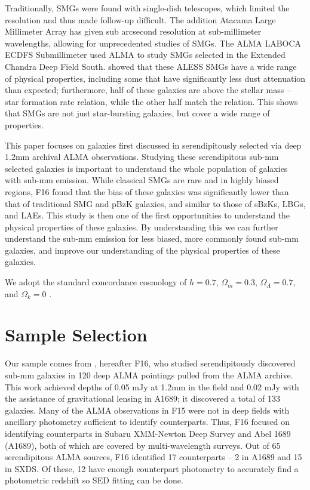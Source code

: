 \documentclass[preprint,natbib209]{aastex}
\begin{document}
Traditionally, SMGs were found with single-dish telescopes, which limited the resolution and thus made follow-up difficult. The addition Atacama Large Millimeter Array has given sub arcsecond resolution at sub-millimeter wavelengths, allowing for unprecedented studies of SMGs. The ALMA LABOCA ECDFS Submillimeter \citep[ALESS;][]{hodge13} used ALMA to study SMGs selected in the Extended Chandra Deep Field South. \cite{dacunha15} showed that these ALESS SMGs have a wide range of physical properties, including some that have significantly less dust attenuation than expected; furthermore, half of these galaxies are above the stellar mass -- star formation rate relation, while the other half match the relation. This shows that SMGs are not just star-bursting galaxies, but cover a wide range of properties.

This paper focuses on galaxies first discussed in \cite{fujimoto16} serendipitously selected via deep 1.2mm archival ALMA observations. 
Studying these serendipitous sub-mm selected galaxies is important to understand the whole population of galaxies with sub-mm emission.
While classical SMGs are rare and in highly biased regions, F16 found that the bias of these galaxies was significantly lower than that of traditional SMG and pBzK galaxies, and similar to those of sBzKs, LBGs, and LAEs. This study is then one of the first opportunities to understand the physical properties of these galaxies. By understanding this we can further understand the sub-mm emission for less biased, more commonly found sub-mm galaxies, and improve our understanding of the physical properties of these galaxies.

We adopt the standard concordance cosmology of $h = 0.7$, $\Omega_m = 0.3$, $\Omega_\Lambda = 0.7$, 
and $\Omega_k = 0$ \citep{planck13}.

\section{Sample Selection} 
\label{sec:sample}

Our sample comes from \citet{fujimoto16}, hereafter F16, who studied serendipitously discovered sub-mm galaxies in 
120 deep ALMA pointings pulled from the ALMA archive. This work achieved depths of 0.05 mJy at 1.2mm in the field and 0.02 mJy 
with the assistance of gravitational lensing in A1689; it discovered a total of 133 galaxies. Many of the ALMA observations in F15 were not
in deep fields with ancillary photometry sufficient to identify counterparts. Thus, F16 focused on identifying counterparts in Subaru XMM-Newton Deep 
Survey \citep[SXDS;][]{furusawa08} and Abel 1689 (A1689), both of which are covered by multi-wavelength surveys. 
Out of 65 serendipitous ALMA sources, F16 identified 17 counterparts -- 2 in A1689 and 15 in SXDS. Of these, 12 have enough counterpart photometry to accurately find a photometric redshift so SED fitting can be done.
\end{document}
